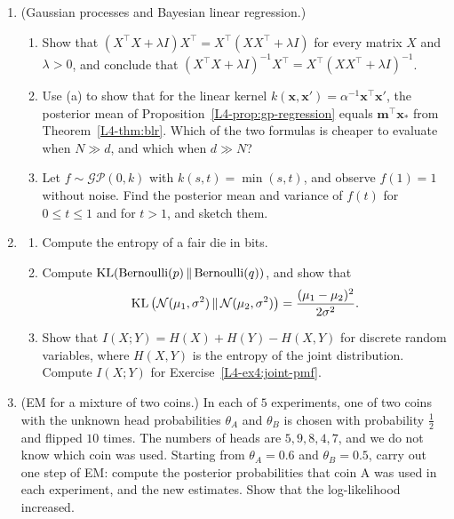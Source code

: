\begin{enumerate}[leftmargin=*]
    \[\frac{\mu_0/\tau^2 + N\bar x/\sigma^2}{1/\tau^2 + N/\sigma^2},\]
    a weighted average of the prior mean and the sample mean. What happens as $N \to \infty$?
    \item (Gaussian processes and Bayesian linear regression.)
    \begin{enumerate}[label=(\alph*)]
        \item Show that $(X^\top X + \lambda I)X^\top = X^\top(XX^\top + \lambda I)$ for every matrix $X$ and $\lambda > 0$, and conclude that $(X^\top X + \lambda I)^{-1}X^\top = X^\top(XX^\top + \lambda I)^{-1}$.
        \item Use (a) to show that for the linear kernel $k(\mathbf{x}, \mathbf{x}') = \alpha^{-1}\mathbf{x}^\top\mathbf{x}'$, the posterior mean of Proposition~\ref{L4-prop:gp-regression} equals $\mathbf{m}^\top\mathbf{x}_*$ from Theorem~\ref{L4-thm:blr}. Which of the two formulas is cheaper to evaluate when $N \gg d$, and which when $d \gg N$?
        \item Let $f \sim \mathcal{GP}(0, k)$ with $k(s, t) = \min(s, t)$, and observe $f(1) = 1$ without noise. Find the posterior mean and variance of $f(t)$ for $0 \leq t \leq 1$ and for $t > 1$, and sketch them.
    \end{enumerate}
    \item \homework{} \begin{enumerate}[label=(\alph*)]
        \item Compute the entropy of a fair die in bits.
        \item Compute $\operatorname{KL}(\text{Bernoulli}(p) \,\|\, \text{Bernoulli}(q))$, and show that
        \[\operatorname{KL}\big(\mathcal{N}(\mu_1, \sigma^2) \,\|\, \mathcal{N}(\mu_2, \sigma^2)\big) = \frac{(\mu_1 - \mu_2)^2}{2\sigma^2}.\]
        \item Show that $I(X; Y) = H(X) + H(Y) - H(X, Y)$ for discrete random variables, where $H(X, Y)$ is the entropy of the joint distribution. Compute $I(X; Y)$ for Exercise~\ref{L4-ex4:joint-pmf}.
    \end{enumerate}
    \item \homework{} (EM for a mixture of two coins.) In each of $5$ experiments, one of two coins with the unknown head probabilities $\theta_A$ and $\theta_B$ is chosen with probability $\frac{1}{2}$ and flipped $10$ times. The numbers of heads are $5, 9, 8, 4, 7$, and we do not know which coin was used. Starting from $\theta_A = 0.6$ and $\theta_B = 0.5$, carry out one step of EM: compute the posterior probabilities that coin A was used in each experiment, and the new estimates. Show that the log-likelihood increased.

\end{enumerate}
